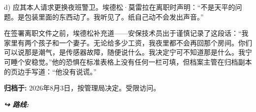 \noindent d) 应其本人请求更换夜班警卫。埃德松·莫雷拉在离职时声明：“不是天平的问题。是包装里面的东西动了。我听见了。纸自己动不会发出声音。”

\noindent 在签署离职文件之前，埃德松补充道——安保技术员出于谨慎记录了这段话：\textquotedblleft{}我家里有两个孩子和一个妻子。无论给多少工资，我夜里都不会再回那个房间。你们可以说那是潮气，是传感器故障，随便说什么。我决定宁可不知道那是什么。我宁可睡个安稳觉。\textquotedblright{}他的恐惧在标准表格上没有任何一栏可填，但档案主管在归档副本的页边手写道：\textquotedblleft{}他没有说谎。\textquotedblright{}

\noindent \textbf{归档于:} 2026年8月3日，按管理局决定。受限访问。





\vspace{0.5em}
\noindent\textit{\textbf{↪ 路线:}  \rotasep {} \rotasep {}}
